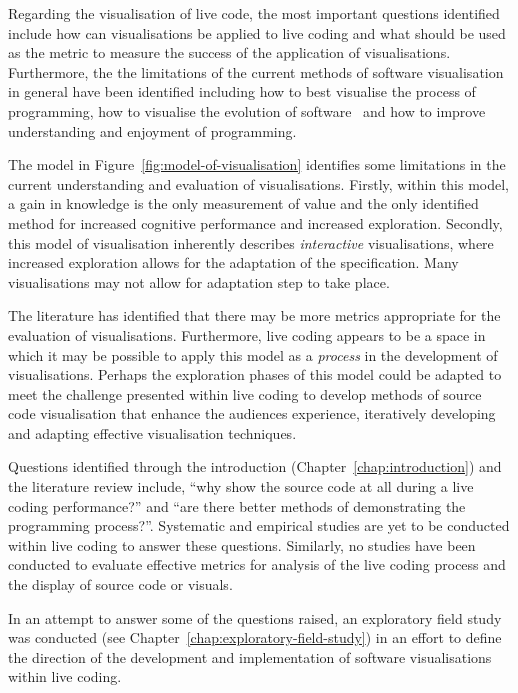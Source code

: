 Regarding the visualisation of live code, the most important questions identified include how can visualisations be applied to live coding and what should be used as the metric to measure the success of the application of visualisations. Furthermore, the the limitations of the current methods of software visualisation in general have been identified including how to best visualise the process of programming, how to visualise the evolution of software~\cite{Gall1999} and how to improve understanding and enjoyment of programming.

The model in Figure~\ref{fig:model-of-visualisation} identifies some limitations in the current understanding and evaluation of visualisations. Firstly, within this model, a gain in knowledge is the only measurement of value and the only identified method for increased cognitive performance and increased exploration. Secondly, this model of visualisation inherently describes \textit{interactive} visualisations, where increased exploration allows for the adaptation of the specification. Many visualisations may not allow for adaptation step to take place. 

The literature has identified that there may be more metrics appropriate for the evaluation of visualisations. Furthermore, live coding appears to be a space in which it may be possible to apply this model as a \textit{process} in the development of visualisations. Perhaps the exploration phases of this model could be adapted to meet the challenge presented within live coding to develop methods of source code visualisation that enhance the audiences experience, iteratively developing and adapting effective visualisation techniques.

Questions identified through the introduction (Chapter~\ref{chap:introduction}) and the literature review include, ``why show the source code at all during a live coding performance?'' and ``are there better methods of demonstrating the programming process?''. Systematic and empirical studies are yet to be conducted within live coding to answer these questions. Similarly, no studies have been conducted to evaluate effective metrics for analysis of the live coding process and the display of source code or visuals.

In an attempt to answer some of the questions raised, an exploratory field study was conducted (see Chapter~\ref{chap:exploratory-field-study}) in an effort to define the direction of the development and implementation of software visualisations within live coding.

